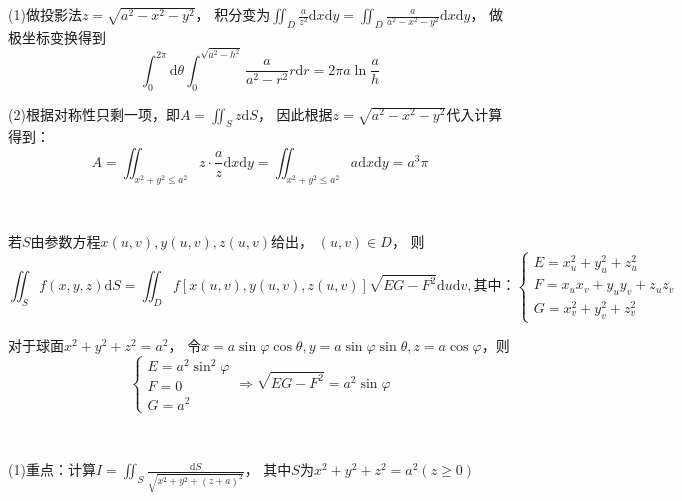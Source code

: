\begin{solution}
  (1)做投影法$z = \sqrt{a^2 - x^2 - y^2}$，
  积分变为$\iint_D \frac{a}{z^2}\mathrm{d} x \mathrm{d} y = \iint_D \frac{a}{a^2 - x^2 - y^2}\mathrm{d} x \mathrm{d} y$，
  做极坐标变换得到
  \begin{equation*}
    \int_0^{2\pi}\mathrm{d} \theta \int_0^{\sqrt{a^2 - h^2}} \frac{a}{a^2 - r^2}r\mathrm{d} r = 2\pi a \ln \frac{a}{h}
  \end{equation*}
  
  (2)根据对称性只剩一项，即$A = \iint _S z \mathrm{d}S $，
  因此根据$z = \sqrt{a^2 - x^2 - y^2}$代入计算得到：
  \begin{equation*}
    A = \iint_{x^2 + y^2 \leq a^2} z \cdot \frac{a}{z} \mathrm{d}x\mathrm{d}y= \iint_{x^2 + y^2 \leq a^2}a \mathrm{d}x\mathrm{d}y = a^3 \pi
  \end{equation*}
\end{solution}

~


\begin{theorem}[参数方程法]
  若$S$由参数方程$x(u,v),y(u,v),z(u,v)$给出，
  $(u,v) \in D$，
  则
  \begin{equation*}
    \iint _S f(x,y,z) \mathrm{d}S = \iint_D f[x(u,v),y(u,v),z(u,v)]\sqrt{EG - F^2}\mathrm{d}u\mathrm{d}v, \text{其中：}
    \begin{cases}
      E = x_u^2 + y_u^2 + z_u^2\\
      F = x_ux_v + y_uy_v + z_uz_v\\
      G = x_v^2 + y_v^2 + z_v^2
    \end{cases}
  \end{equation*}
\end{theorem}

\begin{theorem}[球坐标极坐标变换]
  对于球面$x^2 + y^2 + z^2 = a^2$，
  令$x = a \sin \varphi \cos \theta, y = a \sin \varphi \sin \theta, z = a \cos \varphi$，则
  \begin{equation*}
    \begin{cases}
      E = a^2 \sin ^2 \varphi\\
      F = 0\\
      G = a^2
    \end{cases} \Rightarrow \sqrt{EG - F^2} = a^2 \sin \varphi
  \end{equation*}
\end{theorem}

~

\begin{exercise}[参数方程法]
  (1)重点：计算$I = \iint_S \frac{\mathrm{d} S}{\sqrt{x^2 + y^2 + (z + a)^2}}$，
  其中$S$为$x^2 + y^2 + z^2 = a^2(z \geq 0)$
\end{exercise}

